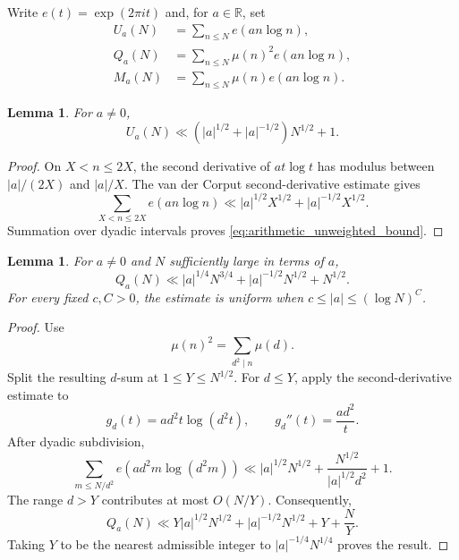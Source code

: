 \documentclass[11pt]{amsart}
\numberwithin{equation}{section}\setcounter{tocdepth}{3}\setcounter{secnumdepth}{3}
\newtheorem{lemma}[theorem]{Lemma}\newtheorem{corollary}[theorem]{Corollary}
\begin{document}
Write $e(t)=\exp(2\pi i t)$ and, for $a\in\mathbb R$, set
\begin{align}
 U_a(N)&=\sum_{n\le N}e(a n\log n),
 \label{eq:arithmetic_unweighted_sum}\\
 Q_a(N)&=\sum_{n\le N}\mu(n)^2e(a n\log n),
 \label{eq:arithmetic_squarefree_sum}\\
 M_a(N)&=\sum_{n\le N}\mu(n)e(a n\log n).
 \label{eq:arithmetic_mobius_sum}
\end{align}

\begin{lemma}
\label{lem:arithmetic_unweighted_bound}
For $a\ne0$,
\begin{equation}
 U_a(N)\ll\left(|a|^{1/2}+|a|^{-1/2}\right)N^{1/2}+1.
 \label{eq:arithmetic_unweighted_bound}
\end{equation}
\end{lemma}
\begin{proof}
On $X<n\le2X$, the second derivative of $a t\log t$ has modulus between
$|a|/(2X)$ and $|a|/X$.  The van der Corput second-derivative estimate
\cite[Chapter~2]{GrahamKolesnik1991} gives
\begin{equation}
 \sum_{X<n\le2X}e(a n\log n)
 \ll |a|^{1/2}X^{1/2}+|a|^{-1/2}X^{1/2}.
 \label{eq:arithmetic_dyadic_unweighted_bound}
\end{equation}
Summation over dyadic intervals proves \eqref{eq:arithmetic_unweighted_bound}.
\end{proof}

\begin{lemma}
\label{lem:arithmetic_squarefree_bound}
For $a\ne0$ and $N$ sufficiently large in terms of $a$,
\begin{equation}
 Q_a(N)\ll
 |a|^{1/4}N^{3/4}+|a|^{-1/2}N^{1/2}+N^{1/2}.
 \label{eq:arithmetic_squarefree_bound}
\end{equation}
For every fixed $c,C>0$, the estimate is uniform when
$c\le|a|\le(\log N)^C$.
\end{lemma}
\begin{proof}
Use
\begin{equation}
 \mu(n)^2=\sum_{d^2\mid n}\mu(d).
 \label{eq:arithmetic_squarefree_identity}
\end{equation}
Split the resulting $d$-sum at $1\le Y\le N^{1/2}$.  For $d\le Y$, apply the
second-derivative estimate to
\begin{equation}
 g_d(t)=a d^2t\log(d^2t),
 \qquad g_d''(t)=\frac{a d^2}{t}.
 \label{eq:arithmetic_squarefree_inner_phase}
\end{equation}
After dyadic subdivision,
\begin{equation}
 \sum_{m\le N/d^2}e(a d^2m\log(d^2m))
 \ll |a|^{1/2}N^{1/2}
 +\frac{N^{1/2}}{|a|^{1/2}d^2}+1.
 \label{eq:arithmetic_squarefree_inner_bound}
\end{equation}
The range $d>Y$ contributes at most $O(N/Y)$.  Consequently,
\begin{equation}
 Q_a(N)\ll
 Y|a|^{1/2}N^{1/2}+|a|^{-1/2}N^{1/2}+Y+\frac NY.
 \label{eq:arithmetic_squarefree_optimization}
\end{equation}
Taking $Y$ to be the nearest admissible integer to
$|a|^{-1/4}N^{1/4}$ proves the result.
\end{proof}
\end{document}
